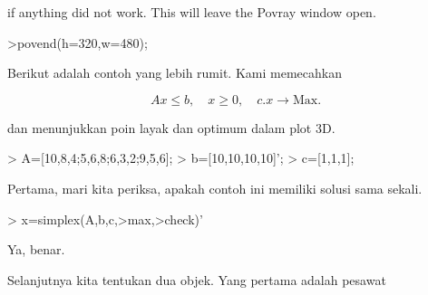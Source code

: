 \documentclass[a4paper,10pt]{article}
\begin{document}
\begin{eulernotebook}
\begin{eulercomment}
\begin{eulercomment}
\begin{eulercomment}
if anything did not work. This will leave the Povray window open.
\end{eulercomment}
\begin{eulerprompt}
>povend(h=320,w=480);
\end{eulerprompt}
\begin{eulercomment}
Berikut adalah contoh yang lebih rumit. Kami memecahkan

\end{eulercomment}
\begin{eulerformula}
\[
Ax \le b, \quad x \ge 0, \quad c.x \to \text{Max.}
\]
\end{eulerformula}
\begin{eulercomment}
dan menunjukkan poin layak dan optimum dalam plot 3D.
\end{eulercomment}
\begin{eulerprompt}
> A=[10,8,4;5,6,8;6,3,2;9,5,6];
> b=[10,10,10,10]';
> c=[1,1,1];
\end{eulerprompt}
\begin{eulercomment}
Pertama, mari kita periksa, apakah contoh ini memiliki solusi sama
sekali.
\end{eulercomment}
\begin{eulerprompt}
> x=simplex(A,b,c,>max,>check)'
\end{eulerprompt}
\begin{euleroutput}
  [0,  1,  0.5]
\end{euleroutput}
\begin{eulercomment}
Ya, benar.

Selanjutnya kita tentukan dua objek. Yang pertama adalah pesawat


\end{eulercomment}
\end{eulercomment}
\end{eulercomment}
\end{eulernotebook}
\end{document}
